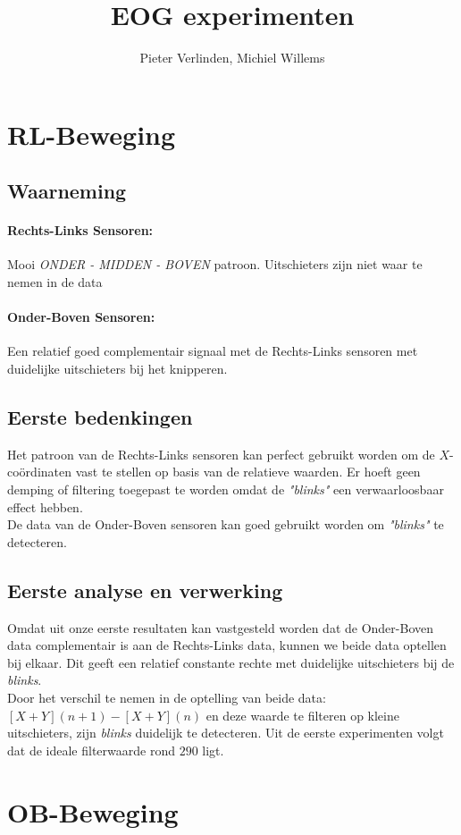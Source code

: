 \documentclass[12pt,a4paper]{article}
\author{Pieter Verlinden, Michiel Willems}
\title{EOG experimenten}
\begin{document}
	\section{RL-Beweging}
			\subsection{Waarneming}
				\paragraph{Rechts-Links Sensoren:}
				Mooi \textit{ONDER - MIDDEN - BOVEN} patroon. Uitschieters zijn niet waar te nemen in de data\\
				\paragraph{Onder-Boven Sensoren:}
				Een relatief goed complementair signaal met de Rechts-Links sensoren met duidelijke uitschieters bij het knipperen.
			\subsection{Eerste bedenkingen}
				Het patroon van de Rechts-Links sensoren kan perfect gebruikt worden om de $X$-coördinaten vast te stellen op basis van de relatieve waarden. Er hoeft geen demping of filtering toegepast te worden omdat de \textit{"blinks"} een verwaarloosbaar effect hebben.\\
				
				De data van de Onder-Boven sensoren kan goed gebruikt worden om \textit{"blinks"} te detecteren.
			\subsection{Eerste analyse en verwerking}
				Omdat uit onze eerste resultaten kan vastgesteld worden dat de Onder-Boven data complementair is aan de Rechts-Links data, kunnen we beide data optellen bij elkaar. Dit geeft een relatief constante rechte met duidelijke uitschieters bij de \textit{blinks}.\\
				
				Door het verschil te nemen in de optelling van beide data: $[X+Y](n+1) - [X+Y](n)$ en deze waarde te filteren op kleine uitschieters, zijn \textit{blinks} duidelijk te detecteren. Uit de eerste experimenten volgt dat de ideale filterwaarde rond $290$ ligt. 
		\section{OB-Beweging}
\end{document}
